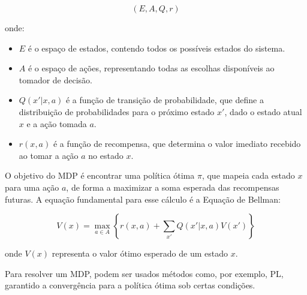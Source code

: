 \[
(E, A, Q, r)
\]

onde:

\begin{itemize}
    \item \(E\) é o espaço de estados, contendo todos os possíveis estados do sistema.
    \item \(A\) é o espaço de ações, representando todas as escolhas disponíveis ao tomador de decisão.
    \item \(Q(x' | x, a)\) é a função de transição de probabilidade, que define a distribuição de probabilidades para o próximo estado \(x'\), dado o estado atual \(x\) e a ação tomada \(a\).
    \item \(r(x, a)\) é a função de recompensa, que determina o valor imediato recebido ao tomar a ação \(a\) no estado \(x\).
\end{itemize}

O objetivo do MDP é encontrar uma política ótima \( \pi \), que mapeia cada estado \( x \) para uma ação \( a \), de forma a maximizar a soma esperada das recompensas futuras. A equação fundamental para esse cálculo é a Equação de Bellman:

\begin{equation}
V(x) = \max_{a \in A} \left\{ r(x, a) + \sum_{x'} Q(x' | x, a) V(x') \right\}
\end{equation}

onde \(V(x)\) representa o valor ótimo esperado de um estado \(x\).

Para resolver um MDP, podem ser usados métodos como, por exemplo, PL, garantido a convergência para a política ótima sob certas condições.

